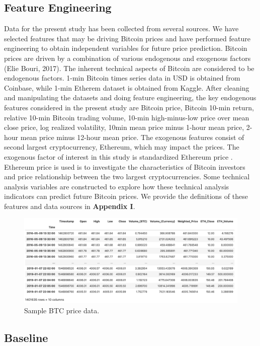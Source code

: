 \documentclass{article}
\begin{document}
\subsection{Feature Engineering}
Data for the present study has been collected from several sources. We have selected features that may be driving Bitcoin prices and have performed feature engineering to obtain independent variables for future price prediction. Bitcoin prices are driven by a combination of various endogenous and exogenous factors (Elie Bouri, 2017). The inherent technical aspects of Bitcoin are considered to be endogenous factors. 1-min Bitcoin times series data in USD is obtained from Coinbase, while 1-min Etherem dataset is obtained from Kaggle. After cleaning and manipulating the datasets and doing feature engineering, the key endogenous features considered in the present study are Bitcoin price, Bitcoin 10-min return, relative 10-min Bitcoin trading volume, 10-min high-minus-low price over mean close price, log realized volatility, 10min mean price minus 1-hour mean price, 2-hour mean price minus 12-hour mean price.  The exogenous features consist of second largest cryptocurrency, Ethereum, which may impact the prices. The exogenous factor of interest in this study is standardized Ethereum price . Ethereum price is used is to investigate the characteristics of Bitcoin investors and price relationship between the two largest cryptocurrencies. Some technical analysis variables are constructed to explore how these technical analysis indicators can predict future Bitcoin prices. We provide the definitions of these features and data sources in \textbf{Appendix I}.

\begin{figure}[h]
  \centering
  \includegraphics{BTc_data.png}
  \caption{Sample BTC price data.}
  \label{fig:fig1}
\end{figure}




\subsection{Baseline}
\end{document}
